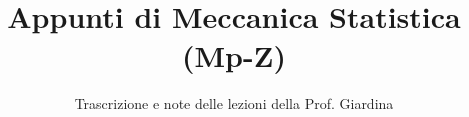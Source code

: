 \documentclass[a4paper,12pt]{article}
\title{Appunti di Meccanica Statistica (Mp-Z)}
\author{Trascrizione e note delle lezioni della Prof. Giardina}
\date{}
\begin{document}
\maketitle
\projectintro
\tableofcontents
\newpage

\end{document}

